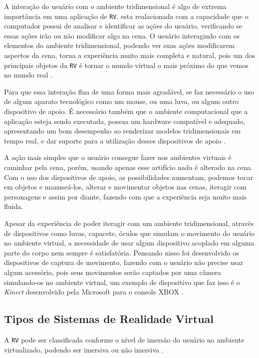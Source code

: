 A interação do usuário com o ambiente tridimensional é algo de extrema importância em uma aplicação de \verb'RV', esta realacionada com a capacidade que o computador possui de analisar e identificar as ações do usuário, verificando se essas ações irão ou não modificar algo na cena. O usuário interagindo com os elementos do ambiente tridimensional, podendo ver suas ações modificarem aspectos da cena, torna a experiência muito mais completa e natural, pois um dos principais objetos da \verb'RV' é tornar o mundo virtual o mais próximo do que vemos no mundo real \cite{kirner2006}.

Para que essa interação flua de uma forma mais agradável, se faz necessário o uso de algum aparato tecnológico como um mouse, ou uma luva, ou algum outro dispositivo de apoio. É necessário também que o ambiente computacional que a aplicação esteja sendo executada, possua um hardware compatível e adequado, apresentando um bom desempenho ao renderizar modelos tridimensionais em tempo real, e dar suporte para a utilização desses dispositivos de apoio \cite{kirner2006}.

A ação mais simples que o usuário consegue fazer nos ambientes virtuais é caminhar pela cena, porém, usando apenas esse artifício nada é alterado na cena. Com o uso dos dispositivos de apoio, as possibilidades aumentam, podemos tocar em objetos e manuseá-los, alterar e movimentar objetos nas cenas, iteragir com personagens e assim por diante, fazendo com que a experiência seja muito mais fluida.

Apesar da experiência de poder iteragir com um ambiente tridimensional, através de dispositivos como luvas, capacete, óculos que simulam o movimento do usuário no ambiente virtual, a necessidade de usar algum dispositivo acoplado em alguma parte do corpo nem sempre é satisfatória. Pensando nisso foi desenvolvido os dispositivos de captura de movimento, fazendo com o usuário não precise usar algum acessório, pois seus movimentos serão captados por uma câmera simulando-os no ambiente virtual, um exemplo de dispositivo que faz isso é o \textit{Kinect} desenvolvido pela Microsoft para o console XBOX \cite{kinect}.

\subsection {Tipos de Sistemas de Realidade Virtual}
A \verb'RV' pode ser classificada conforme o nível de imersão do usuário no ambiente virtualizado, podendo ser imersiva ou não imersiva \cite{kirner2006}.

